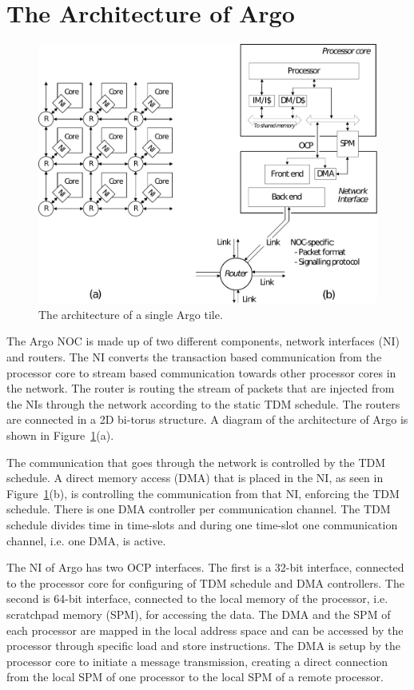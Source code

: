 \documentclass[a4paper,fontsize=10pt,twoside,DIV15,BCOR12mm,headinclude=true,footinclude=false,pagesize,bibtotoc]{scrbook}
\begin{document}
\section{The Architecture of Argo}
\label{sec:arch}


\begin{figure}
\centering
\includegraphics[scale=0.45]{fig/argo.pdf}
\caption{The architecture of a single Argo tile.}
\label{fig:diag}
\end{figure}

The Argo NOC is made up of two different components,
network interfaces (NI) and routers.
The NI converts the transaction based communication from the processor core to
stream based communication towards other processor cores in the network.
The router is routing the stream of packets that are injected from the NIs
through the network according to the static TDM schedule.
The routers are connected in a 2D bi-torus structure.
A diagram of the architecture of Argo is shown in Figure~\ref{fig:diag}(a).


The communication that goes through the network is controlled by the TDM schedule.
A direct memory access (DMA) that is placed in the NI, as seen in Figure~\ref{fig:diag}(b),
is controlling the communication from that NI, enforcing the TDM schedule.
There is one DMA controller per communication channel.
The TDM schedule divides time in time-slots and during one time-slot one 
communication channel, i.e. one DMA, is active.

The NI of Argo has two OCP \cite{ocp:spec} interfaces. The first is a 32-bit interface,
connected to the processor core for configuring of TDM schedule and DMA controllers.
The second is 64-bit interface, connected to the local memory of the processor, i.e. scratchpad memory (SPM),
for accessing the data. The DMA and the SPM of each processor are mapped in the local address space and
can be accessed by the processor through specific load and store instructions.
The DMA is setup by the processor core to initiate a message transmission,
creating a direct connection from the local SPM of one processor to the local SPM of a remote processor. 
\end{document}

